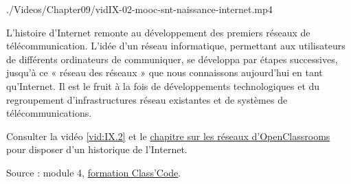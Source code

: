\begin{marginvideo}
		{./Videos/Chapter09/vidIX-02-mooc-snt-naissance-internet.mp4}%
\end{marginvideo}

L’histoire d'Internet remonte au développement des premiers réseaux de télécommunication. L’idée d’un réseau informatique, permettant aux utilisateurs de différents ordinateurs de communiquer, se développa par étapes successives, jusqu'à ce « réseau des réseaux » que nous connaissons aujourd’hui en tant qu'Internet. Il est le fruit à la fois de développements technologiques et du regroupement d’infrastructures réseau existantes et de systèmes de télécommunications.

Consulter la vidéo \cref{vid:IX.2} et le \href{https://openclassrooms.com/fr/courses/4297411-connecter-le-reseau/4304641-comprenez-l-evolution-des-reseaux#r-4358261}{chapitre sur les réseaux d'OpenClassrooms} pour disposer d'un historique de l'Internet. 


\noindent Source : module 4, \href{https://pixees.fr/classcode/formations/module4/}{formation Class'Code}.


